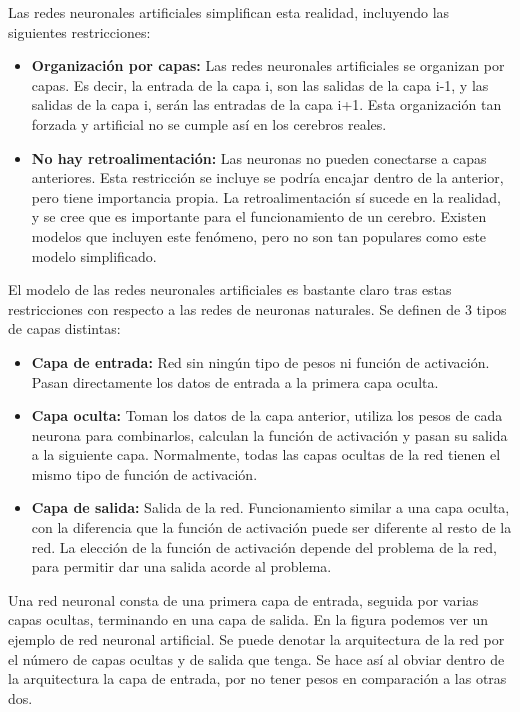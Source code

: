Las redes neuronales artificiales simplifican esta realidad, incluyendo las siguientes restricciones:
\begin{itemize}
\item \textbf{Organización por capas:} Las redes neuronales artificiales se organizan por capas. Es decir, la entrada de la capa i, son las salidas de la capa i-1, y las salidas de la capa i, serán las entradas de la capa i+1. Esta organización tan forzada y artificial no se cumple así en los cerebros reales. 
\item \textbf{No hay retroalimentación:} Las neuronas no pueden conectarse a capas anteriores. Esta restricción se incluye se podría encajar dentro de la anterior, pero tiene importancia propia. La retroalimentación sí sucede en la realidad, y se cree que es importante para el funcionamiento de un cerebro. Existen modelos que incluyen este fenómeno, pero no son tan populares como este modelo simplificado. 
\end{itemize}

El modelo de las redes neuronales artificiales es bastante claro tras estas restricciones con respecto a las redes de neuronas naturales. Se definen de 3 tipos de capas distintas:
\begin{itemize}
\item \textbf{Capa de entrada:} Red sin ningún tipo de pesos ni función de activación. Pasan directamente los datos de entrada a la primera capa oculta.
\item \textbf{Capa oculta:} Toman los datos de la capa anterior, utiliza los pesos de cada neurona para combinarlos, calculan la función de activación y pasan su salida a la siguiente capa. Normalmente, todas las capas ocultas de la red tienen el mismo tipo de función de activación.
\item \textbf{Capa de salida:} Salida de la red. Funcionamiento similar a una capa oculta, con la diferencia que la función de activación puede ser diferente al resto de la red. La elección de la función de activación depende del problema de la red, para permitir dar una salida acorde al problema.
\end{itemize}

Una red neuronal consta de una primera capa de entrada, seguida por varias capas ocultas, terminando en una capa de salida. En la figura  podemos ver un ejemplo de red neuronal artificial. Se puede denotar la arquitectura de la red por el número de capas ocultas y de salida que tenga. Se hace así al obviar dentro de la arquitectura la capa de entrada, por no tener pesos en comparación a las otras dos.\\

